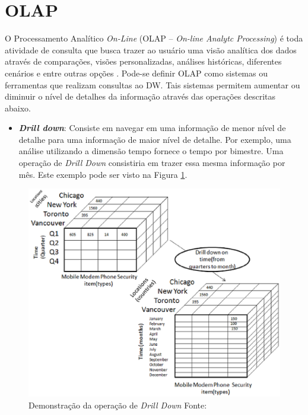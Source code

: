 \section{OLAP}

\label{sec-olap}

O Processamento Analítico \emph{On-Line} (OLAP – \emph{On-line Analytc Processing}) é toda atividade de consulta que busca trazer ao usuário uma visão analítica dos dados através de comparações, visões personalizadas, análises históricas, diferentes cenários e entre outras opções \cite{kimball2002}.
%
Pode-se definir OLAP como sistemas ou ferramentas que realizam consultas ao DW.
%
Tais sistemas permitem aumentar ou diminuir o nível de detalhes da informação através das operações descritas abaixo. 



\begin{itemize}

	\item \textbf{\emph{Drill down}}: Consiste em navegar em uma informação de menor nível de detalhe para uma informação de maior nível de detalhe. Por exemplo, uma análise utilizando a dimensão tempo fornece o tempo por bimestre. Uma operação de \emph{Drill Down} consistiria em trazer essa mesma informação por mês. Este exemplo pode ser visto na Figura \ref{fig-dw-rollup}.
\end{itemize}
	
\begin{figure}[!htb]
 	\centering
 		\includegraphics[scale=0.7]{figuras/dw-drill-down}
 		\caption{Demonstração da operação de \emph{Drill Down}   Fonte: \cite{TutorialsPoint}}
 		\label{fig-dw-rollup}
 \end{figure}

